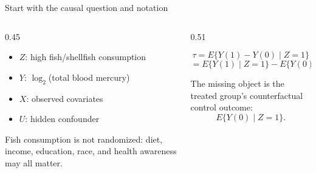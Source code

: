 \documentclass[aspectratio=169,10pt]{ctexbeamer}
\newcommand{\keyword}[1]{\textcolor{DeepBlue}{\textbf{#1}}}
\begin{document}
\begin{frame}{Start with the causal question and notation}
  \begin{columns}[T,totalwidth=\textwidth]
    \begin{column}{0.45\textwidth}
      \begin{bluebox}[title=NHANES application]
        \begin{itemize}
          \item \keyword{$Z$}: high fish/shellfish consumption
          \item \keyword{$Y$}: $\log_2$(total blood mercury)
          \item \keyword{$X$}: observed covariates
          \item \keyword{$U$}: hidden confounder
        \end{itemize}
      \end{bluebox}
      \vspace{0.35cm}
      \begin{redbox}
        \centering
        Fish consumption is not randomized: diet, income, education, race, and health awareness may all matter.
      \end{redbox}
    \end{column}
    \begin{column}{0.51\textwidth}
      \begin{graybox}[title=Target estimand]
        \[
          \tau = E\{Y(1)-Y(0)\mid Z=1\}
        \]
        \[
          = E\{Y(1)\mid Z=1\} - E\{Y(0)\mid Z=1\}
        \]
      \end{graybox}
      \vspace{0.35cm}
      \begin{yellowbox}
        \centering
        The missing object is the treated group's counterfactual control outcome:
        \[
          E\{Y(0)\mid Z=1\}.
        \]
      \end{yellowbox}
    \end{column}
  \end{columns}
\end{frame}
\end{document}
